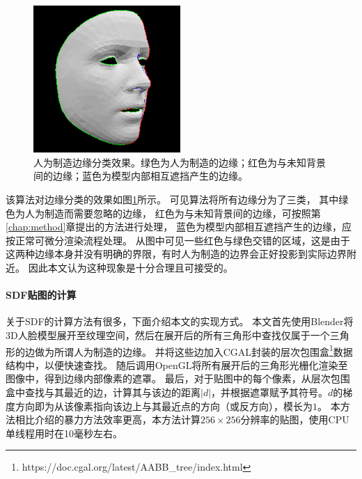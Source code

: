 \begin{figure}
\centering
\includegraphics[height=2.2in]{figures/debug_sdf}
\caption[人为制造边缘分类效果]{人为制造边缘分类效果。绿色为人为制造的边缘；红色为与未知背景间的边缘；蓝色为模型内部相互遮挡产生的边缘。}
\label{fig:sdf_result}
\end{figure}

该算法对边缘分类的效果如图\ref{fig:sdf_result}所示。
可见算法将所有边缘分为了三类，
其中绿色为人为制造而需要忽略的边缘，
红色为与未知背景间的边缘，可按照第\ref{chap:method}章提出的方法进行处理，
蓝色为模型内部相互遮挡产生的边缘，应按正常可微分渲染流程处理。
从图中可见一些红色与绿色交错的区域，这是由于这两种边缘本身并没有明确的界限，有时人为制造的边界会正好投影到实际边界附近。
因此本文认为这种现象是十分合理且可接受的。

\paragraph{SDF贴图的计算}
关于SDF的计算方法有很多，下面介绍本文的实现方式。
本文首先使用Blender将3D人脸模型展开至纹理空间，然后在展开后的所有三角形中查找仅属于一个三角形的边做为所谓人为制造的边缘。
并将这些边加入CGAL封装的层次包围盒\footnote{https://doc.cgal.org/latest/AABB\_tree/index.html}数据结构中，以便快速查找。
随后调用OpenGL将所有展开后的三角形光栅化渲染至图像中，得到边缘内部像素的遮罩。
最后，对于贴图中的每个像素，从层次包围盒中查找与其最近的边，计算其与该边的距离$|d|$，并根据遮罩赋予其符号。$d$的梯度方向即为从该像素指向该边上与其最近点的方向（或反方向），模长为$1$。
本方法相比\citet{sdf_glyphs}介绍的暴力方法效率更高，本方法计算$256\times256$分辨率的贴图，使用CPU单线程用时在10毫秒左右。

